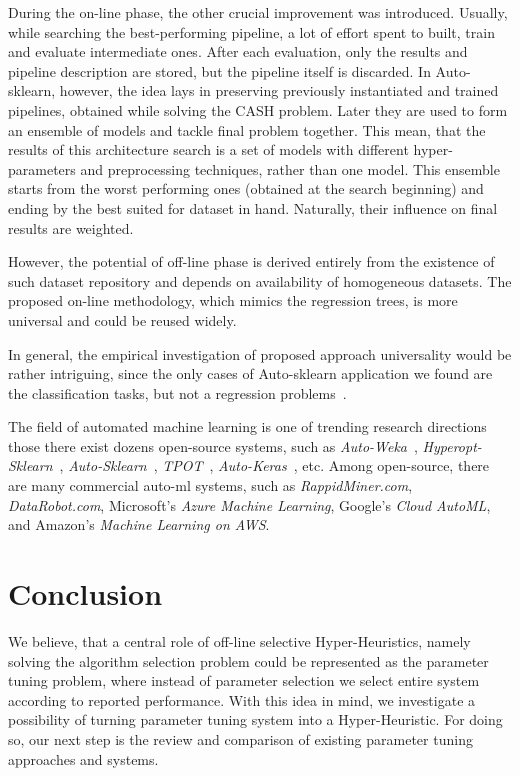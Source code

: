 During the on-line phase, the other crucial improvement was introduced. 
Usually, while searching the best-performing pipeline, a lot of effort spent to built, train and evaluate intermediate ones. After each evaluation, only the results and pipeline description are stored, but the pipeline itself is discarded. In Auto-sklearn, however, the idea lays in preserving previously instantiated and trained pipelines, obtained while solving the CASH problem. Later they are used to form an ensemble of models and tackle final problem together. This mean, that the results of this architecture search is a set of models with different hyper-parameters and preprocessing techniques, rather than one model. This ensemble starts from the worst performing ones (obtained at the search beginning) and ending by the best suited for dataset in hand. Naturally, their influence on final results are weighted.

However, the potential of off-line phase is derived entirely from the existence of such dataset repository and depends on availability of homogeneous datasets. The proposed on-line methodology, which mimics the regression trees, is more universal and could be reused widely.

In general, the empirical investigation of proposed approach universality would be rather intriguing, since the only cases of Auto-sklearn application we found are the classification tasks, but not a regression problems~\cite{feurer2015efficient,biedenkapp-ecai20}.


The field of automated machine learning is one of trending research directions those there exist dozens open-source systems, such as \textit{Auto-Weka}~\cite{thornton2013auto}, \textit{Hyperopt-Sklearn}~\cite{komer2014hyperopt}, \textit{Auto-Sklearn}~\cite{feurer2015efficient}, \textit{TPOT}~\cite{olson2019tpot}, \textit{Auto-Keras}~\cite{jin2019auto}, etc. Among open-source, there are many commercial auto-ml systems, such as \textit{RappidMiner.com}, \textit{DataRobot.com}, Microsoft’s \textit{Azure Machine Learning}, Google’s \textit{Cloud AutoML}, and Amazon's \textit{Machine Learning on AWS}.


\section{Conclusion}
We believe, that a central role of off-line selective Hyper-Heuristics, namely solving the algorithm selection problem could be represented as the parameter tuning problem, where instead of parameter selection we select entire system according to reported performance. With this idea in mind, we investigate a possibility of turning parameter tuning system into a Hyper-Heuristic.
For doing so, our next step is the review and comparison of existing parameter tuning approaches and systems. 

